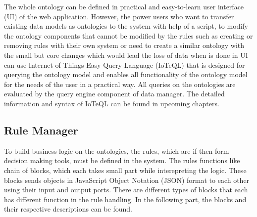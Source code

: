 The whole ontology can be defined in practical and easy-to-learn user interface (UI) of the web application. However, the power users who want to transfer existing data models as ontologies to the system with help of a script, to modify the ontology components that cannot be modified by the rules such as creating or removing rules with their own system or need to create a similar ontology with the small but core changes which would lead the loss of data when is done in UI can use Internet of Things Easy Query Language (IoTeQL) that is designed for querying the ontology model and enables all functionality of the ontology model for the needs of the user in a practical way. All queries on the ontologies are evaluated by the query engine component of data manager. The detailed information and syntax of IoTeQL can be found in upcoming chapters. %

\subsection{Rule Manager}
\label{ss:rule_manager}

To build business logic on the ontologies, the rules, which are if-then form decision making tools, must be defined in the system. The rules functions like chain of blocks, which each takes small part while interepreting the logic. These blocks sends objects in JavaScript Object Notation (JSON) format to each other using their input and output ports. There are different types of blocks that each has different function in the rule handling. In the following part, the blocks and their respective descriptions can be found.

